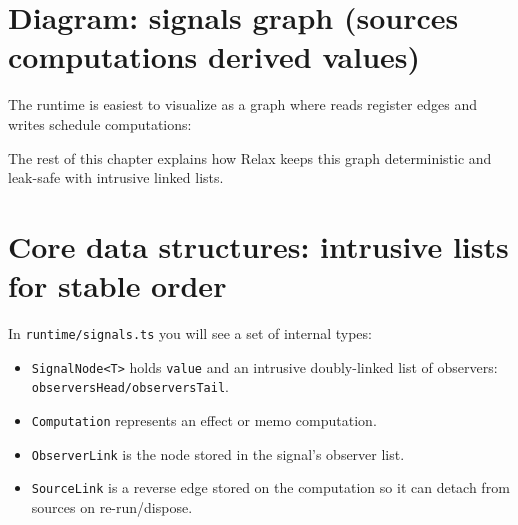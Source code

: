 \section{Diagram: signals graph (sources \textrightarrow computations \textrightarrow derived values)}
The runtime is easiest to visualize as a graph where reads register edges and writes schedule computations:

\begin{center}
\end{center}

The rest of this chapter explains how Relax keeps this graph deterministic and leak-safe with intrusive linked lists.

\section{Core data structures: intrusive lists for stable order}

In \texttt{runtime/signals.ts} you will see a set of internal types:

\begin{itemize}
  \item \texttt{SignalNode<T>} holds \texttt{value} and an intrusive doubly-linked list of observers: \texttt{observersHead/observersTail}.
  \item \texttt{Computation} represents an effect or memo computation.
  \item \texttt{ObserverLink} is the node stored in the signal's observer list.
  \item \texttt{SourceLink} is a reverse edge stored on the computation so it can detach from sources on re-run/dispose.
\end{itemize}

